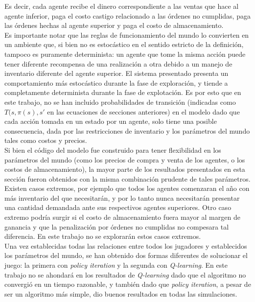Es decir, cada agente recibe el dinero correspondiente a las ventas que hace al agente inferior, paga el costo castigo relacionado a las \'ordenes no cumplidas, paga las \'ordenes hechas al agente superior y paga el costo de almacenamiento.\\

Es importante notar que las reglas de funcionamiento del mundo lo convierten en un ambiente que, si bien no es estoc\'astico en el sentido estricto de la definici\'on, tampoco es puramente determinista: un agente que tome la misma acci\'on puede tener diferente recompensa de una realizaci\'on a otra debido a un manejo de inventario diferente del agente superior. El sistema presentado presenta un comportamiento m\'as estoc\'astico durante la fase de exploraci\'on, y tiende a completamente determinista durante la fase de explotaci\'on. Es por esto que en este trabajo, no se han incluido probabilidades de transici\'on (indicadas como $T(s, \pi(s), s'$ en las ecuaciones de secciones anteriores) en el modelo dado que cada acci\'on tomada en un estado por un agente, solo tiene una posible consecuencia, dada por las restricciones de inventario y los par\'ametros del mundo tales como costos y precios.\\

Si bien el c\'odigo del modelo fue construido para tener flexibilidad en los par\'ametros del mundo (como los precios de compra y venta de los agentes, o los costos de almacenamiento), la mayor parte de los resultados presentados en esta secci\'on fueron obtenidos con la misma combinaci\'on prudente de tales par\'ametros. Existen casos extremos, por ejemplo que todos los agentes comenzaran el a\~no con m\'as inventario del que necesitar\'an, y por lo tanto nunca necesitar\'an presentar una cantidad demandada ante sus respectivos agentes superiores. Otro caso extremo podr\'ia surgir si el costo de almacenamiento fuera mayor al margen de ganancia y que la penalizaci\'on por \'ordenes no cumplidas no compesara tal diferencia. En este trabajo no se explorar\'an estos casos extremos.\\

Una vez establecidas todas las relaciones entre todos los jugadores y establecidos los par\'ametros del mundo, se han obtenido dos formas diferentes de solucionar el juego: la primera con \textit{policy iteration} y la segunda con \textit{Q-learning}. En este trabajo no se ahondar\'a en los resultados de \textit{Q-learning} dado que el algoritmo no convergi\'o en un tiempo razonable, y tambi\'en dado que \textit{policy iteration}, a pesar de ser un algoritmo m\'as simple, dio buenos resultados en todas las simulaciones.

